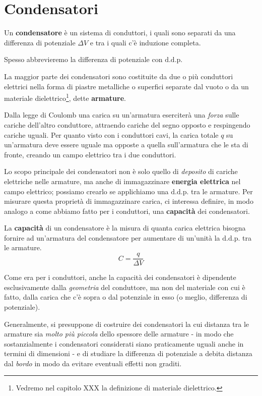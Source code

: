 \section{Condensatori}
\begin{define}[Condensatore]
	Un \textbf{condensatore} è un sistema di conduttori, i quali sono separati da una differenza di potenziale $\Delta V$ e tra i quali c'è induzione completa.
\end{define}
\begin{notate}
	Spesso abbrevieremo la differenza di potenziale con $\mathrm{d.d.p.}$
\end{notate}
La maggior parte dei condensatori sono costituite da due o più conduttori elettrici nella forma di piastre metalliche o superfici separate dal vuoto o da un materiale dielettrico\footnote{Vedremo nel capitolo XXX la definizione di materiale dielettrico.}, dette \textbf{armature}.

Dalla legge di Coulomb una carica su un'armatura eserciterà una \textit{forza} sulle cariche dell'altro conduttore, attraendo cariche del segno opposto e respingendo cariche uguali. Per quanto visto con i conduttori cavi, la carica totale $q$ su un'armatura deve essere uguale ma opposte a quella sull'armatura che le sta di fronte, creando un campo elettrico tra i due conduttori.

Lo scopo principale dei condensatori non è solo quello di \textit{deposito} di cariche elettriche nelle armature, ma anche di immagazzinare \textbf{energia elettrica} nel campo elettrico; possiamo crearlo se applichiamo una $\textrm{d.d.p.}$ tra le armature. Per misurare questa proprietà di immagazzinare carica, ci interessa definire, in modo analogo a come abbiamo fatto per i conduttori, una \textbf{capacità} dei condensatori.
\begin{define}
	La \textbf{capacità} di un condensatore è la misura di quanta carica elettrica bisogna fornire ad un'armatura del condensatore per aumentare di un'unità la $\mathrm{d.d.p.}$ tra le armature.
	\begin{equation}
		C=\frac{q}{\Delta V}
	\end{equation}
\end{define}
Come era per i conduttori, anche la capacità dei condensatori è dipendente esclusivamente dalla \textit{geometria} del conduttore, ma non del materiale con cui è fatto, dalla carica che c'è sopra o dal potenziale in esso (o meglio, differenza di potenziale).
\begin{observe}
	Generalmente, si presuppone di costruire dei condensatori la cui distanza tra le armature sia \textit{molto più piccola} dello spessore delle armature - in modo che sostanzialmente i condensatori considerati siano praticamente uguali anche in termini di dimensioni - e di studiare la differenza di potenziale a debita distanza dal \textit{bordo} in modo da evitare eventuali effetti non graditi.
\end{observe}
